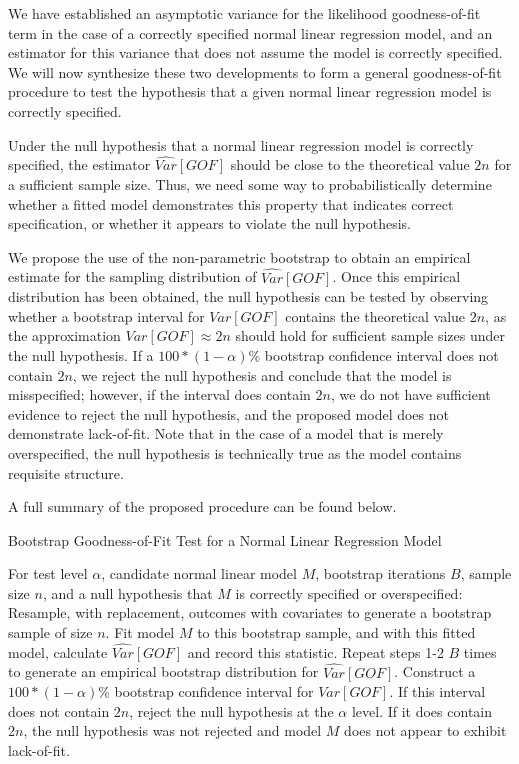 \documentclass[12pt]{article} %
\theoremstyle{definition}
\begin{document}
		We have established an asymptotic variance for the likelihood goodness-of-fit term in the case of a correctly specified normal linear regression model, and an
		estimator for this variance that does not assume the model is correctly specified. We will now synthesize these two developments to form a general goodness-of-fit procedure to
		test the hypothesis that a given normal linear regression model is correctly specified.

		Under the null hypothesis that a normal linear regression model is correctly specified, the estimator $\widehat{Var}[GOF]$ should be close to the theoretical value $2n$ for a
		sufficient sample size. Thus, we need some way to probabilistically determine whether a fitted model demonstrates this property that indicates correct specification, or whether it
		appears to violate the null hypothesis.
		
		We propose the use of the non-parametric bootstrap to obtain an empirical estimate for the sampling distribution of $\widehat{Var}[GOF]$. Once this empirical distribution
		has been obtained, the null hypothesis can be tested by observing whether a bootstrap interval for $Var[GOF]$ contains the theoretical value $2n$, as the approximation
		$Var[GOF] \approx 2n$ should hold for sufficient sample sizes under the null hypothesis. If a $100*(1-\alpha)$\% bootstrap confidence interval does not contain 
		$2n$, we reject the null hypothesis and conclude that the model is misspecified; however, if the interval does contain $2n$, we do not have sufficient evidence to reject
		the null hypothesis, and the proposed model does not demonstrate lack-of-fit. Note that in the case of a model that is merely overspecified, the null hypothesis is technically
		true as the model contains requisite structure.

		A full summary of the proposed procedure can be found below.
		\begin{algorithm*}
			\caption{Bootstrap Goodness-of-Fit Test for a Normal Linear Regression Model}
			\begin{algorithmic}[1]
			  \Statex For test level $\alpha$, candidate normal linear model $M$, bootstrap iterations $B$, sample size $n$, and a null hypothesis that $M$
			  is correctly specified or overspecified:
			  \State Resample, with replacement, outcomes with covariates to generate a bootstrap sample of size $n$.
			  \State Fit model $M$ to this bootstrap sample, and with this fitted model, calculate $\widehat{Var}[GOF]$
			  and record this statistic.
			  \State Repeat steps 1-2 $B$ times to generate an empirical bootstrap distribution for $\widehat{Var}[GOF]$.
			  \State Construct a $100*(1-\alpha)$\% bootstrap confidence interval for $Var[GOF]$.
			  \State If this interval does not contain $2n$, reject the null hypothesis at the $\alpha$ level. If it does contain
			  $2n$, the null hypothesis was not rejected and model $M$ does not appear to exhibit lack-of-fit. 
			\end{algorithmic}
		\end{algorithm*}
\end{document}
